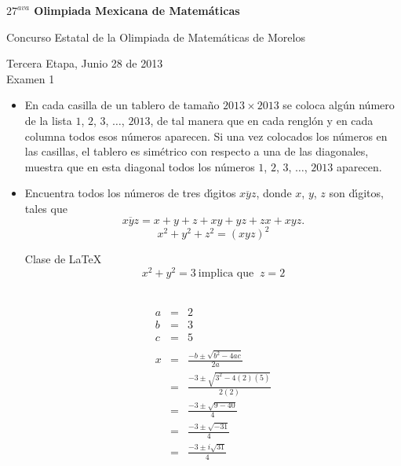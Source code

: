 \documentclass [12pt]{article}
\begin{document}
\begin{center}
          {\bf\Large $27^{ava}$ Olimpiada Mexicana de Matem\'aticas}
          \vspace{.5cm}

          Concurso Estatal de la Olimpiada de Matem\'aticas de Morelos

	    \vspace{.3cm}
          Tercera Etapa, Junio 28 de 2013\\
          Examen 1
\end{center}
	

\vspace{.5in}

\begin{itemize}

\item En cada casilla de un tablero de tama\~no $2013 \times 2013$ se coloca
alg\'un n\'umero de la lista $1$, $2$, $3$, $\dots$, $2013$, de tal manera que en cada rengl\'on y en 
cada columna todos esos n\'umeros aparecen. Si una vez colocados los n\'umeros en las casillas, 
el tablero es sim\'etrico con respecto a una de las diagonales, muestra que en esta diagonal todos los 
n\'umeros $1$, $2$, $3$, $\dots$, $2013$ aparecen.

\vspace{.6in}


\item  Encuentra todos los n\'umeros de tres d\'{\i}gitos $\overline{xyz}$, donde
$x$, $y$, $z$ son d\'{\i}gitos, tales que 
$$\overline{xyz}=x+y+z+xy+yz+zx+xyz.$$
$$ x^2 + y^2 + z^2 = (xyz)^2 $$
\begin{center}
	Clase de LaTeX
	$$ x^2 + y^2 = 3 \  \mbox{implica que } \  z = 2 $$ \\
\end{center}

\begin{eqnarray*}
		a &=& 2 \\
		b &=& 3 \\
		c &=& 5\\ \\
		x &=& \frac{-b\pm{\sqrt{b^2-4ac}}}{2a} \\
		  &=& \frac{-3\pm{\sqrt{3^2-4(2)(5)}}}{2(2)} \\
		  &=& \frac{-3\pm{\sqrt{9-40}}}{4} \\
		  &=& \frac{-3\pm{\sqrt{-31}}}{4} \\
		  &=& \frac{-3\pm{i\sqrt{31}}}{4}
\end{eqnarray*}


\end{itemize}
\end{document}
